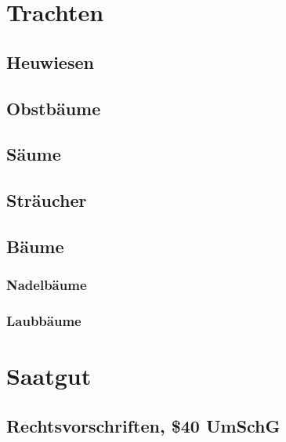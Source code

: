 \documentclass[
]{book}
\begin{document}
\hypertarget{trachten}{%
\section{Trachten}\label{trachten}}

\hypertarget{heuwiesen}{%
\subsection{Heuwiesen}\label{heuwiesen}}

\hypertarget{obstbuxe4ume}{%
\subsection{Obstbäume}\label{obstbuxe4ume}}

\hypertarget{suxe4ume}{%
\subsection{Säume}\label{suxe4ume}}

\hypertarget{struxe4ucher}{%
\subsection{Sträucher}\label{struxe4ucher}}

\hypertarget{buxe4ume}{%
\subsection{Bäume}\label{buxe4ume}}

\hypertarget{nadelbuxe4ume}{%
\subsubsection{Nadelbäume}\label{nadelbuxe4ume}}

\hypertarget{laubbuxe4ume}{%
\subsubsection{Laubbäume}\label{laubbuxe4ume}}

\hypertarget{saatgut}{%
\section{Saatgut}\label{saatgut}}

\hypertarget{rechtsvorschriften-40-umschg}{%
\subsection{Rechtsvorschriften, \$40 UmSchG}\label{rechtsvorschriften-40-umschg}}
\end{document}
